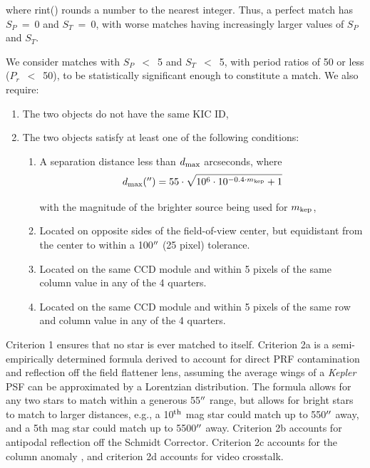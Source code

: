 \noindent where rint() rounds a number to the nearest integer. Thus, a perfect match has $S_{P}$~=~0 and  $S_{T}$~=~0, with worse matches having increasingly larger values of $S_{P}$ and $S_{T}$. 

We consider matches with $S_{P}$~$<$~5 and $S_{T}$~$<$~5, with period ratios of 50 or less ($P_{r}$~$<$~50), to be statistically significant enough to constitute a match. We also require:

\begin{enumerate}

\item The two objects do not have the same KIC ID,

\item The two objects satisfy at least one of the following conditions: 

    \begin{enumerate}
    
    \item A separation distance less than $d_{\rm max}$ arcseconds, where
    \begin{equation}
    \label{disteq}
    d_{\rm max}(\arcsec) = 55\cdot\sqrt{10^{6}\cdot 10^{-0.4 \cdot m_{\rm kep}}+1}
    \end{equation}

\noindent with the \kepler{} magnitude of the brighter source being used for $m_{\rm kep}$,  

    \item Located on opposite sides of the field-of-view center, but equidistant from the center to within a 100$\mbox{$^{\prime\prime}$}$ (25 pixel) tolerance.
    
    \item Located on the same CCD module and within 5 pixels of the same column value in any of the 4 quarters.
    
    \item Located on the same CCD module and within 5 pixels of the same row and column value in any of the 4 quarters.

   \end{enumerate}

\end{enumerate}


\noindent Criterion 1 ensures that no star is ever matched to itself. Criterion 2a is a semi-empirically determined formula derived to account for direct PRF contamination and reflection off the field flattener lens, assuming the average wings of a \emph{Kepler} PSF can be approximated by a Lorentzian distribution. The formula allows for any two stars to match within a generous 55$\mbox{$^{\prime\prime}$}$ range, but allows for bright stars to match to larger distances, e.g., a 10$^{\rm th}$ mag star could match up to 550$\mbox{$^{\prime\prime}$}$ away, and a 5th mag star could match up to 5500$\mbox{$^{\prime\prime}$}$ away. Criterion 2b accounts for antipodal reflection off the Schmidt Corrector. Criterion 2c accounts for the column anomaly \citep[see \S3.5 of][]{Coughlin2016}, and criterion 2d accounts for video crosstalk.


